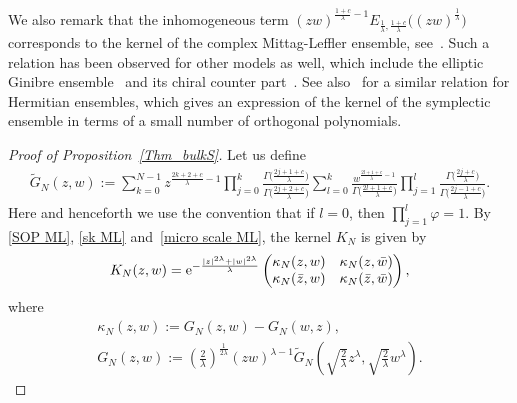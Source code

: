\documentclass[pdftex]{sigma}
\numberwithin{equation}{section}
\newcommand{\1}{\chi}
\begin{document}
We also remark that the inhomogeneous term $(zw)^{ \frac{1+c}{\lambda}-1 } E_{ \frac{1}{\lambda},\frac{1+c}{\lambda} } \big( (zw)^{\frac{1}{\lambda}} \big)$ corresponds to the kernel of the complex Mittag-Leffler ensemble, see~\cite{ameur2018random}.
Such a relation has been observed for other models as well, which include the elliptic Ginibre ensemble~\cite{BE} and its chiral counter part~\cite{MR2180006}.
See also~\cite{MR1762659,MR1675356} for a similar relation for Hermitian ensembles, which gives an expression of the kernel of the symplectic ensemble in terms of a small number of orthogonal polynomials.

\begin{proof}[Proof of Proposition~\ref{Thm_bulkS}]
	Let us define
	\begin{gather*} %
		\widetilde{G}_{N}(z,w):=\sum_{k=0}^{N-1}z^{ \frac{2k+2+c}{\lambda}-1 } \prod_{j=0}^k \frac{ \Gamma\big( \frac{2j+1+c}{\lambda} \big) }{\Gamma\big( \frac{2j+2+c}{\lambda} \big)}
		\sum_{l=0}^{k} \frac{ w^{ \frac{2l+1+c}{\lambda}-1 } }{\Gamma\big( \frac{2l+1+c}{\lambda}\big)} \prod_{j=1}^l \frac{\Gamma\big( \frac{2j+c}{\lambda} \big)}{ \Gamma\big(\frac{2j-1+c}{\lambda}\big) } .
	\end{gather*}
	Here and henceforth we use the convention that if $l=0$, then $\prod_{j=1}^l \varphi=1$.
	By \eqref{SOP ML}, \eqref{sk ML} and~\eqref{micro scale ML}, the kernel $K_N$ is given by
	\begin{gather*}
			K_N(z,w)
			={\rm e}^{ -\frac{ |z|^{2\lambda}+|w|^{2\lambda} }{\lambda} } \begin{pmatrix}
				\kappa_N(z,w) & \kappa_N(z,\bar{w}) \\
				\kappa_N(\bar{z},w) & \kappa_N(\bar{z},\bar{w})
			\end{pmatrix},
		\end{gather*}
	where
	\begin{gather*}
		\kappa_N(z,w):=G_N(z,w)-G_N(w,z), \\ G_N(z,w):=\left( \frac{2}{\lambda} \right)^{\frac{1}{2\lambda}} (zw)^{\lambda-1} \widetilde{G}_N \left( \sqrt{ \frac{2}{\lambda} } z^\lambda, \sqrt{ \frac{2}{\lambda} } w^\lambda \right).
	\end{gather*}
	

\end{proof}
\end{document}
